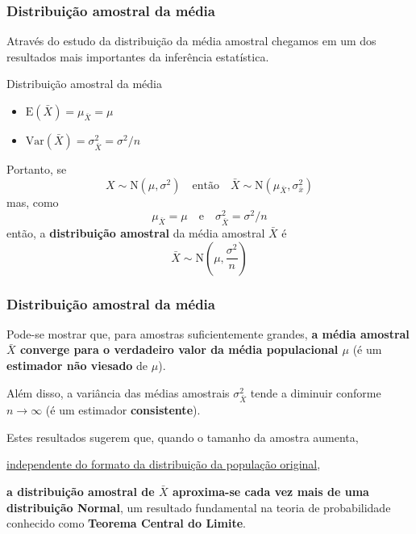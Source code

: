 \documentclass[11pt]{beamer}
\begin{document}
\begin{frame}
\frametitle{Distribuição amostral da média}

Através do estudo da distribuição da média amostral chegamos em um dos
resultados mais importantes da inferência estatística.

\begin{block}{Distribuição amostral da média}

\begin{itemize}
\item
  \(\text{E}(\bar{X}) = \mu_{\bar{X}} = \mu\)
\item
  \(\text{Var}(\bar{X}) = \sigma^2_{\bar{X}} = \sigma^2/n\)
\end{itemize}

Portanto, se \[X \sim \text{N}(\mu, \sigma^2) \quad \text{então} \quad
\bar{X} \sim \text{N}(\mu_{\bar{X}}, \sigma^2_{\bar{x}})\] mas, como
\[\mu_{\bar{X}} = \mu \quad \text{e} \quad \sigma^2_{\bar{X}} =
\sigma^2/n\] então, a \textbf{distribuição amostral} da média amostral
\(\bar{X}\) é
\[\bar{X} \sim \text{N}\left(\mu, \frac{\sigma^2}{n} \right)\]
\end{block}
\end{frame}

\begin{frame}
\frametitle{Distribuição amostral da média}

Pode-se mostrar que, para amostras suficientemente grandes, \textbf{a
média amostral \(\bar{X}\) converge para o verdadeiro valor da média
populacional \(\mu\)} (é um \textbf{estimador não viesado} de \(\mu\)).

Além disso, a variância das médias amostrais \(\sigma^2_{\bar{X}}\)
tende a diminuir conforme \(n \rightarrow \infty\) (é um estimador
\textbf{consistente}).

Estes resultados sugerem que, quando o tamanho da amostra aumenta,

\begin{center}
\underline{independente do formato da distribuição da população
original},
\end{center}

\textbf{a distribuição amostral de \(\bar{X}\) aproxima-se cada vez mais
de uma distribuição Normal}, um resultado fundamental na teoria de
probabilidade conhecido como \textbf{Teorema Central do Limite}.
\end{frame}
\end{document}
